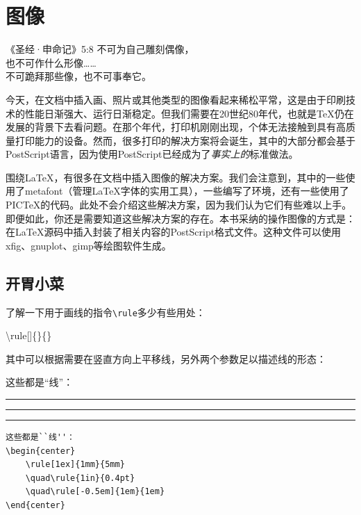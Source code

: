 \chapter{图像}

\begin{epigraphe}{《圣经·申命记》5:8}
    不可为自己雕刻偶像，\\也不可作什么形像……\\不可跪拜那些像，也不可事奉它。
\end{epigraphe}

今天，在文档中插入画、照片或其他类型的图像看起来稀松平常，这是由于印刷技术的性能日渐强大、运行日渐稳定。但我们需要在20世纪80年代，也就是\TeX 仍在发展的背景下去看问题。在那个年代，打印机刚刚出现，个体无法接触到具有高质量打印能力的设备。然而，很多打印的解决方案将会诞生，其中的大部分都会基于PostScript语言，因为使用PostScript已经成为了\emph{事实上的}标准做法。

围绕\LaTeX ，有很多在文档中插入图像的解决方案。我们会注意到，其中的一些使用了\textsf{metafont}（管理\LaTeX 字体的实用工具），一些编写了环境，还有一些使用了PIC\TeX 的代码。此处不会介绍这些解决方案，因为我们认为它们有些难以上手。即便如此，你还是需要知道这些解决方案的存在。本书采纳的操作图像的方式是：在\LaTeX 源码中插入封装了相关内容的PostScript格式文件。这种文件可以使用\textsf{xfig}、\textsf{gnuplot}、\textsf{gimp}等绘图软件生成。

\section{开胃小菜}

了解一下用于画线的指令\verb|\rule|多少有些用处：

\begin{dmd}
\backslash rule[]\{\}\{\}
\end{dmd}

其中可以根据需要在竖直方向上平移线，另外两个参数足以描述线的形态：

\begin{codelist}[5.1]{
    这些都是``线''：
\begin{center}
    \rule[1ex]{1mm}{5mm}
    \quad\rule{1in}{0.4pt}
    \quad\rule[-0.5em]{1em}{1em}
\end{center}
}
\begin{verbatim}
这些都是``线''：
\begin{center}
    \rule[1ex]{1mm}{5mm}
    \quad\rule{1in}{0.4pt}
    \quad\rule[-0.5em]{1em}{1em}
\end{center}\end{verbatim}
\end{codelist}

